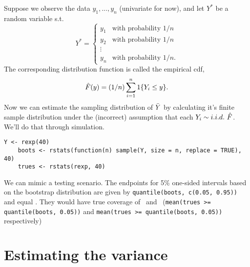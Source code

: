 \begin{itemize}
  Suppose we observe the data $y_1,...,y_n$ (univariate for now), and
  let $Y^*$ be a random variable s.t.
  \begin{equation*}
    Y^* =
    \begin{cases}
      y_1 & \text{with probability } 1/n \\
      y_2 & \text{with probability } 1/n \\
      \vdots \\
      y_n & \text{with probability } 1/n.
    \end{cases}
  \end{equation*}
  The corresponding distribution function is called the empirical cdf,
  \begin{equation*}
    \hat{F}(y) = (1/n) \sum_{i=1}^n \operatorname{1}\{ Y_i \leq y \}.
  \end{equation*}
  Now we can estimate the sampling distribution of $\bar{Y}$ by
  calculating it's finite sample distribution under the (incorrect)
  assumption that each $Y_i \sim i.i.d.\ \hat{F}$.  We'll do that through
  simulation.

  \begin{lstlisting}[gobble=4]
    Y <- rexp(40)
    boots <- rstats(function(n) sample(Y, size = n, replace = TRUE), 40)
    trues <- rstats(rexp, 40)
  \end{lstlisting}

  We can mimic a testing scenario.  The endpoints for 5\% one-sided
  intervals based on the bootstrap distribution are given by
  \lstinline|quantile(boots, c(0.05, 0.95))| and equal \bootquantiles.
  They would have true coverage of \bootleft\ and \bootright\
  (\lstinline|mean(trues >= quantile(boots, 0.05))| and
  \lstinline|mean(trues >= quantile(boots, 0.05))| respectively)

\end{itemize}

\section{Estimating the variance}

